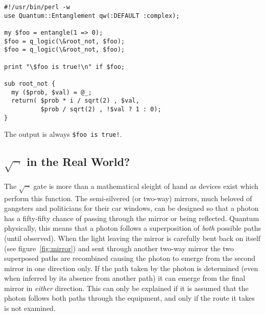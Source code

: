 \documentclass{article}      %
\newcommand{\ptt}[1]{\texttt{#1}}    %
\begin{document}
\begin{verbatim}
#!/usr/bin/perl -w
use Quantum::Entanglement qw(:DEFAULT :complex);

my $foo = entangle(1 => 0);
$foo = q_logic(\&root_not, $foo);
$foo = q_logic(\&root_not, $foo);

print "\$foo is true!\n" if $foo;

sub root_not {
  my ($prob, $val) = @_;
  return( $prob * i / sqrt(2) , $val,
	      $prob / sqrt(2) , !$val ? 1 : 0);
}
\end{verbatim} %

The output is always \ptt{\$foo is true!}.

\subsection{$\sqrt{\neg}$ in the Real World?}

The $\sqrt{\neg}$ gate is more than a mathematical sleight
of hand as devices exist which perform this function.  The semi-silvered
(or two-way) mirrors, much beloved of gangsters and politicians for
their car windows, can be designed so that a photon has a fifty-fifty
chance of passing through the mirror or being reflected.  Quantum
physically, this means that a photon follows a superposition of
\emph{both} possible paths (until observed).  When the
light leaving the mirror is carefully bent back on itself (see
figure~\ref{fig:mirror}) and sent through another two-way mirror the
two superposed paths are recombined causing the photon to emerge from
the second mirror in one direction only.  If the path taken by the
photon is determined (even when inferred by its absence from another
path) it can emerge from the final mirror in \textit{either} direction.
This can only be explained
if it is assumed that the photon follows both paths through the
equipment, and only if the route it takes is not examined.
\end{document}
